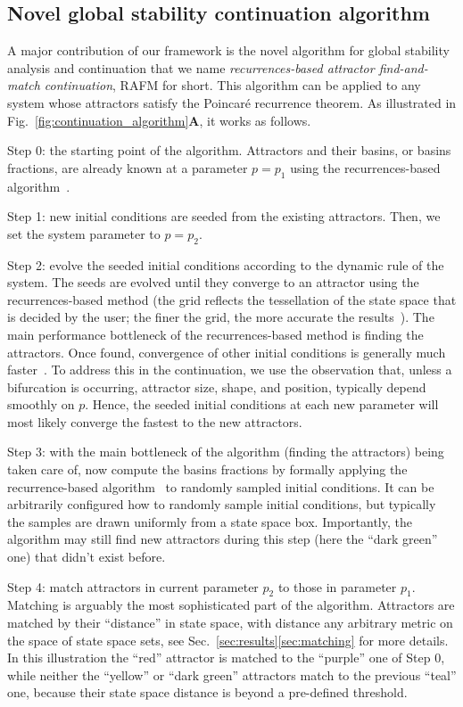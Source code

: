 \documentclass[%
 aip,
 amsmath,amssymb,
 reprint,%
]{revtex4-1}
\begin{document}
\subsection{Novel global stability continuation algorithm}
\label{sec:recurrences_continuation}
A major contribution of our framework is the novel algorithm for global stability analysis and continuation that we name \emph{recurrences-based attractor find-and-match continuation}, RAFM for short. This algorithm can be applied to any system whose attractors satisfy the Poincar\'e recurrence theorem. As illustrated in Fig.~\ref{fig:continuation_algorithm}\textbf{A}, it works as follows.

Step 0: the starting point of the algorithm. Attractors and their basins, or basins fractions, are already known at a parameter $p=p_1$ using the recurrences-based algorithm~\cite{DatserisWagemakers2022}. 

Step 1: new initial conditions are seeded from the existing attractors. Then, we set the system parameter to $p=p_2$. 

Step 2: evolve the seeded initial conditions according to the dynamic rule of the system. The seeds are evolved until they converge to an attractor using the recurrences-based method (the grid reflects the tessellation of the state space that is decided by the user; the finer the grid, the more accurate the results~\cite{DatserisWagemakers2022}). 
The main performance bottleneck of the recurrences-based method is finding the attractors. Once found, convergence of other initial conditions is generally much faster~\cite{DatserisWagemakers2022}. To address this in the continuation, we use the observation that, unless a bifurcation is occurring, attractor size, shape, and position, typically depend smoothly on $p$. Hence, the seeded initial conditions at each new parameter will most likely converge the fastest to the new attractors.

Step 3: with the main bottleneck of the algorithm (finding the attractors) being taken care of, now compute the basins fractions by formally applying the recurrence-based algorithm~\cite{DatserisWagemakers2022} to randomly sampled initial conditions. It can be arbitrarily configured how to randomly sample initial conditions, but typically the samples are drawn uniformly from a state space box. Importantly, the algorithm may still find new attractors during this step (here the ``dark green'' one) that didn't exist before. 

Step 4: match attractors in current parameter $p_2$ to those in parameter $p_1$. Matching is arguably the most sophisticated part of the algorithm. Attractors are matched by their ``distance'' in state space, with distance any arbitrary metric on the space of state space sets, see Sec.~\ref{sec:results}\ref{sec:matching} for more details. In this illustration the ``red'' attractor is matched to the ``purple'' one of Step 0, while neither the ``yellow'' or ``dark green'' attractors match to the previous ``teal'' one, because their state space distance is beyond a pre-defined threshold.
\end{document}
